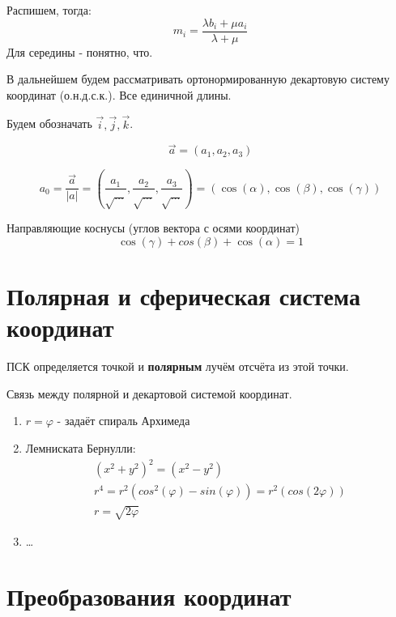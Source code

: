 \documentclass[12pt, a4paper]{article}
\begin{document}
    Распишем, тогда:
    \[
        m_i = \frac{\lambda b_i + \mu a_i}{\lambda + \mu}
    \]
    Для середины - понятно, что.
    
    В дальнейшем будем рассматривать ортонормированную декартовую систему координат (о.н.д.с.к.).
    Все единичной длины.
    
    Будем обозначать $\vec{i}, \vec{j}, \vec{k}$.

    \begin{equation}
        \vec{a} = (a_1, a_2, a_3)        
    \end{equation}

    \begin{equation}
        a_0 = \frac{\vec{a}}{|a|} 
        = (\frac{a_1}{\sqrt{\ldots}}, \frac{a_2}{\sqrt{\ldots}}, \frac{a_3}{\sqrt{\ldots}}) 
        = (\cos(\alpha), \cos(\beta), \cos(\gamma))
    \end{equation}

    Направляющие коснусы (углов вектора с осями координат)
    \begin{equation}
        \cos(\gamma) + cos(\beta) + \cos(\alpha) = 1
    \end{equation}

    \section{Полярная и сферическая система координат}
    ПСК определяется точкой и \textbf{полярным} лучём отсчёта из этой точки.

    Связь между полярной и декартовой системой координат.
    \begin{enumerate}
        \item $r = \varphi$ - задаёт спираль Архимеда
        \item Лемниската Бернулли: \begin{gather}
            (x^2 + y^2)^2 = (x^2 - y^2) \\
            r^4 = r^2(cos^2(\varphi) - sin(\varphi)) = r^2(cos(2\varphi)) \\
            r = \sqrt{2\varphi}
        \end{gather}
        \item \ldots
    \end{enumerate}
    
    \section{Преобразования координат}
\end{document}
